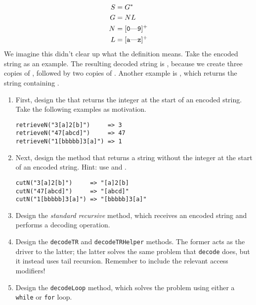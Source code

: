 \begin{align*}
S &= G^{*}\\
G &= NL\\
N &= [\text{\ttt{0}---\ttt{9}}]^{+}\\
L &= [\text{\ttt{a}---\ttt{z}}]^{+}
\end{align*}
We imagine this didn't clear up what the definition means. Take the encoded string  as an example. The resulting decoded string is , because we create three copies of , followed by two copies of . Another example is , which returns the string containing .

\begin{enumerate}[label=(\alph*)]
    \item First, design the  that returns the integer at the start of an encoded string. Take the following examples as motivation.
\begin{verbatim}
retrieveN("3[a]2[b]")     => 3
retrieveN("47[abcd]")     => 47
retrieveN("1[bbbbb]3[a]") => 1
\end{verbatim}
    \item Next, design the  method that returns a string without the integer at the start of an encoded string. Hint: use  and .
\begin{verbatim}
cutN("3[a]2[b]")     => "[a]2[b]
cutN("47[abcd]")     => "[abcd]"
cutN("1[bbbbb]3[a]") => "[bbbbb]3[a]"
\end{verbatim}
    \item Design the \textit{standard recursive}  method, which receives an encoded string and performs a decoding operation.
    \item Design the \texttt{decodeTR} and \texttt{decodeTRHelper} methods. The former acts as the driver to the latter; the latter solves the same problem that \texttt{decode} does, but it instead uses tail recursion. Remember to include the relevant access modifiers!
    \item Design the \texttt{decodeLoop} method, which solves the problem using either a \texttt{while} or \texttt{for} loop.
\end{enumerate}


